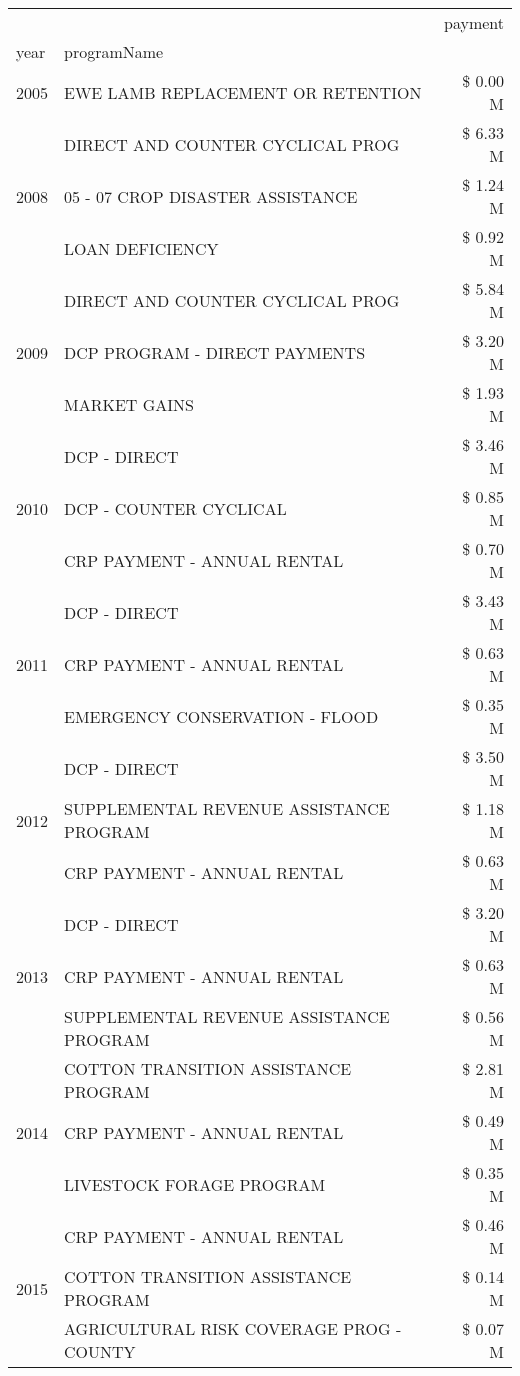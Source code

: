 \begin{tabular}{llr}
\toprule
 &  & payment \\
year & programName &  \\
\midrule
2005 & EWE LAMB REPLACEMENT OR RETENTION & \$ 0.00 M \\
\cline{1-3}
\multirow[t]{3}{*}{2008} & DIRECT AND COUNTER CYCLICAL PROG & \$ 6.33 M \\
 & 05 - 07 CROP DISASTER ASSISTANCE & \$ 1.24 M \\
 & LOAN DEFICIENCY & \$ 0.92 M \\
\cline{1-3}
\multirow[t]{3}{*}{2009} & DIRECT AND COUNTER CYCLICAL PROG & \$ 5.84 M \\
 & DCP PROGRAM - DIRECT PAYMENTS & \$ 3.20 M \\
 & MARKET GAINS & \$ 1.93 M \\
\cline{1-3}
\multirow[t]{3}{*}{2010} & DCP - DIRECT & \$ 3.46 M \\
 & DCP - COUNTER CYCLICAL & \$ 0.85 M \\
 & CRP PAYMENT - ANNUAL RENTAL & \$ 0.70 M \\
\cline{1-3}
\multirow[t]{3}{*}{2011} & DCP - DIRECT & \$ 3.43 M \\
 & CRP PAYMENT - ANNUAL RENTAL & \$ 0.63 M \\
 & EMERGENCY CONSERVATION - FLOOD & \$ 0.35 M \\
\cline{1-3}
\multirow[t]{3}{*}{2012} & DCP - DIRECT & \$ 3.50 M \\
 & SUPPLEMENTAL REVENUE ASSISTANCE PROGRAM & \$ 1.18 M \\
 & CRP PAYMENT - ANNUAL RENTAL & \$ 0.63 M \\
\cline{1-3}
\multirow[t]{3}{*}{2013} & DCP - DIRECT & \$ 3.20 M \\
 & CRP PAYMENT - ANNUAL RENTAL & \$ 0.63 M \\
 & SUPPLEMENTAL REVENUE ASSISTANCE PROGRAM & \$ 0.56 M \\
\cline{1-3}
\multirow[t]{3}{*}{2014} & COTTON TRANSITION ASSISTANCE PROGRAM & \$ 2.81 M \\
 & CRP PAYMENT - ANNUAL RENTAL & \$ 0.49 M \\
 & LIVESTOCK FORAGE PROGRAM & \$ 0.35 M \\
\cline{1-3}
\multirow[t]{3}{*}{2015} & CRP PAYMENT - ANNUAL RENTAL & \$ 0.46 M \\
 & COTTON TRANSITION ASSISTANCE PROGRAM & \$ 0.14 M \\
 & AGRICULTURAL RISK COVERAGE PROG - COUNTY & \$ 0.07 M \\

\end{tabular}
